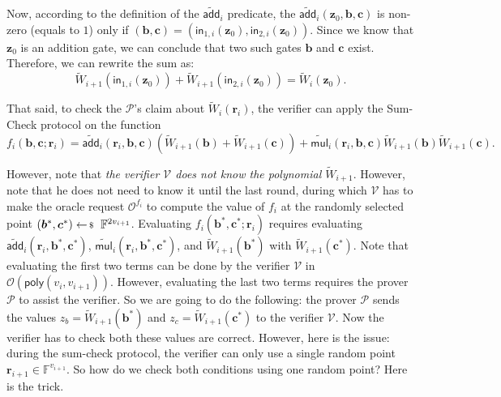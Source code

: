 Now, according to the definition of the $\widetilde{\mathsf{add}}_i$ predicate,
the $\widetilde{\mathsf{add}}_i(\mathbf{z}_0,\boldsymbol{b},\boldsymbol{c})$ is
non-zero (equals to $1$) only if $(\boldsymbol{b}, \boldsymbol{c}) =
(\mathsf{in}_{1,i}(\mathbf{z}_0), \mathsf{in}_{2,i}(\mathbf{z}_0))$. Since we
know that $\mathbf{z}_0$ is an addition gate, we can conclude that two such
gates $\boldsymbol{b}$ and $\boldsymbol{c}$ exist. Therefore, we can rewrite the
sum as:
\begin{equation*}
    \widetilde{W}_{i+1}(\mathsf{in}_{1,i}(\mathbf{z}_0)) + \widetilde{W}_{i+1}(\mathsf{in}_{2,i}(\mathbf{z}_0)) = \widetilde{W}_i(\mathbf{z}_0).
\end{equation*}

That said, to check the $\mathcal{P}$'s claim about $\widetilde{W}_i(\mathbf{r}_i)$, the verifier 
can apply the Sum-Check protocol on the function
\begin{equation*}
    f_i(\boldsymbol{b}, \boldsymbol{c}; \mathbf{r}_i) = \widetilde{\mathsf{add}}_i(\mathbf{r}_i, \boldsymbol{b}, \boldsymbol{c})(\widetilde{W}_{i+1}(\boldsymbol{b}) + \widetilde{W}_{i+1}(\boldsymbol{c})) + \widetilde{\mathsf{mul}}_i(\mathbf{r}_i, \boldsymbol{b}, \boldsymbol{c})\widetilde{W}_{i+1}(\boldsymbol{b})\widetilde{W}_{i+1}(\boldsymbol{c}).
\end{equation*}

However, note that \textit{the verifier $\mathcal{V}$ does not know the
polynomial $\widetilde{W}_{i+1}$}. However, note that he does not need to know
it until the last round, during which $\mathcal{V}$ has to make the oracle
request $\mathcal{O}^{f_i}$ to compute the value of $f_i$ at the randomly
selected point $(\boldsymbol{b}^*, \boldsymbol{c}^*) \leftarrowS
\mathbb{F}^{2v_{i+1}}$. Evaluating $f_i(\boldsymbol{b}^*, \boldsymbol{c}^*;
\mathbf{r}_i)$ requires evaluating
$\widetilde{\mathsf{add}}_i(\mathbf{r}_i,\boldsymbol{b}^*,\boldsymbol{c}^*)$,
$\widetilde{\mathsf{mul}}_i(\mathbf{r}_i,\boldsymbol{b}^*,\boldsymbol{c}^*)$,
and $\widetilde{W}_{i+1}(\boldsymbol{b}^*)$ with
$\widetilde{W}_{i+1}(\boldsymbol{c}^*)$. Note that evaluating the first two
terms can be done by the verifier $\mathcal{V}$ in
$\mathcal{O}(\mathsf{poly}(v_i,v_{i+1}))$. However, evaluating the last two
terms requires the prover $\mathcal{P}$ to assist the verifier. So we are going
to do the following: the prover $\mathcal{P}$ sends the values
$z_b=\widetilde{W}_{i+1}(\boldsymbol{b}^*)$ and
$z_c=\widetilde{W}_{i+1}(\boldsymbol{c}^*)$ to the verifier $\mathcal{V}$. Now
the verifier has to check both these values are correct. However, here is the
issue: during the sum-check protocol, the verifier can only use a single random
point $\mathbf{r}_{i+1} \in \mathbb{F}^{v_{i+1}}$. So how do we check both 
conditions using one random point? Here is the trick.

